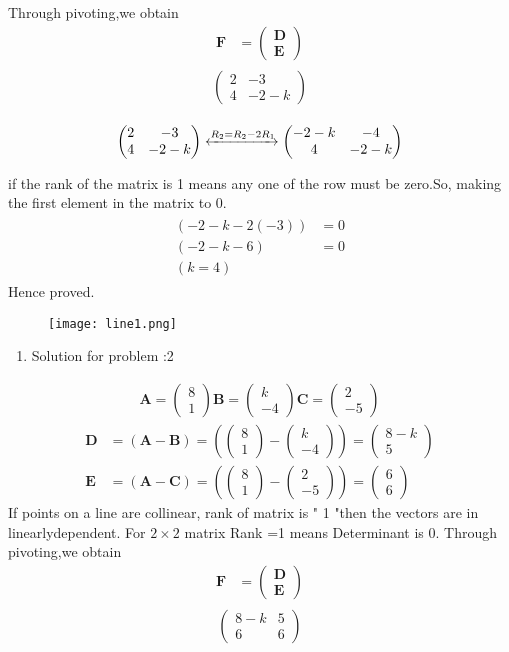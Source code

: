 \documentclass[12pt]{article}
\newcommand{\myvec}[1]{\ensuremath{\begin{pmatrix}#1\end{pmatrix}}}
\let\vec\mathbf
\providecommand{\brak}[1]{\ensuremath{\left(#1\right)}}
\let\vec\mathbf
\begin{document}
Through pivoting,we obtain
\begin{align}
\vec{F} &={\myvec{\vec{D}\\ \vec{E}}}
\end{align}
\begin{align}
\begin{split}
\myvec{
2 & -3
 \\
4 & -2-k 
}
\end{split}
\end{align}

\begin{align}
\label{eq:chem_balance_mat_row}
\myvec{
2 & -3
\\
4 & -2-k
}
 \xleftrightarrow[]{R_2 = R_2-2R_1}
\myvec{
-2-k & -4
\\
4 & -2-k
}
\end{align}

if the rank of the matrix is 1 means any one of the row must be zero.So, making the first element in the matrix to 0.
\begin{align}
\begin{split}
\brak{-2-k-2(-3)}&=0
\\
\brak{-2-k-6}&=0
\\
\brak{k=4} 
\end{split}
\end{align}
Hence proved.
\begin{figure}[h!]
	  \centering 
	  \texttt{[image: line1.png]}
	  \caption{}
	  \label{fig:line1.png}
	  \end{figure} 	 
\begin{enumerate} 
\item Solution for problem :2
\end{enumerate} 
\begin{align}  
\vec{A}=\myvec{8 \\ 1}
\vec{B}=\myvec{k \\ -4}
\vec{C}=\myvec{2 \\ -5}
\end{align}
\begin{align}  
 \vec{D} &=\brak{\vec{A}-\vec{B}} = \brak{\myvec{8 \\1 } - \myvec{k \\-4 } } = \myvec{8-k \\ 5 }\\
\vec{E} &= \brak{\vec{A}-\vec{C}} = \brak{\myvec{8 \\ 1 } - \myvec{2 \\-5 } } = \myvec{6 \\6}
\end{align}
If points on a line  are  collinear, rank of matrix is " 1 "then the vectors are in linearlydependent.
For $2\times2$ matrix Rank =1 means Determinant is 0.
Through pivoting,we obtain
\begin{align}
\vec{F} &={\myvec{\vec{D}\\ \vec{E}}}
\end{align}
\begin{align}
\begin{split}
\myvec{
8-k & 5
 \\
6 & 6
}
\end{split}
\end{align}
\end{document}

